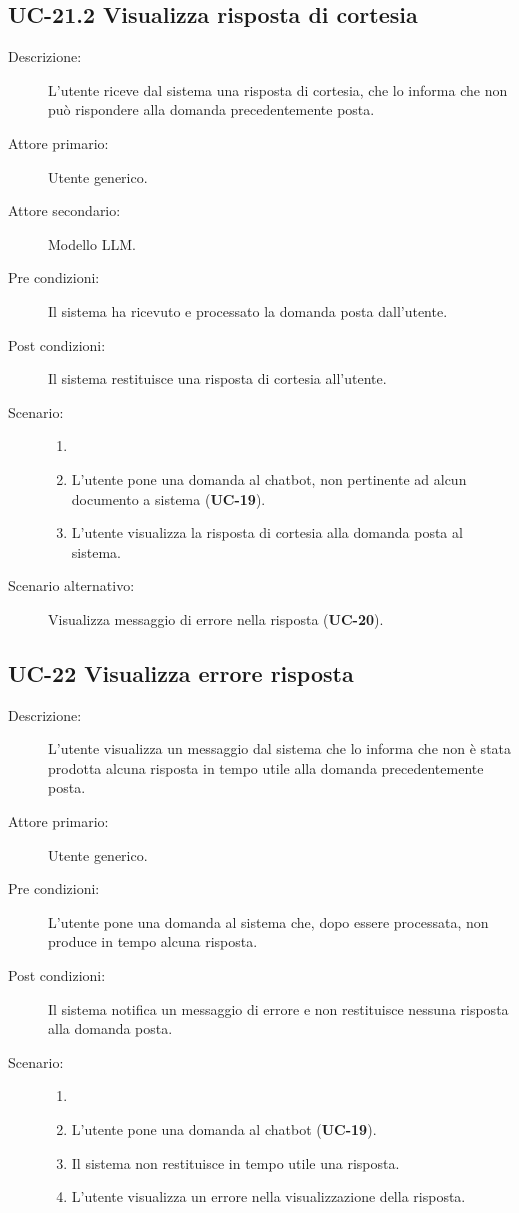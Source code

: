 \subsection{UC-21.2 Visualizza risposta di cortesia}
\begin{description}
    \item[Descrizione:] L'utente riceve dal sistema una risposta di cortesia, che lo informa che non può rispondere alla domanda precedentemente posta.
    \item[Attore primario:] Utente generico.
    \item[Attore secondario:] Modello LLM. 
    \item[Pre condizioni:] Il sistema ha ricevuto e processato la domanda posta dall'utente.
    \item[Post condizioni:] Il sistema restituisce una risposta di cortesia all'utente.
    \item[Scenario:]
    \begin{enumerate}
        \item[]
        \item L’utente pone una domanda al chatbot, non pertinente ad alcun documento a sistema (\textbf{UC-19}).
        \item L'utente visualizza la risposta di cortesia alla domanda posta al sistema.
    \end{enumerate}
    \item[Scenario alternativo:] Visualizza messaggio di errore nella risposta (\textbf{UC-20}).
\end{description}

\subsection{UC-22 Visualizza errore risposta}
\begin{description}
    \item[Descrizione:] L'utente visualizza un messaggio dal sistema che lo informa che non è stata prodotta alcuna risposta in tempo utile alla domanda precedentemente posta.
    \item[Attore primario:] Utente generico.
    \item[Pre condizioni:] L'utente pone una domanda al sistema che, dopo essere processata, non produce in tempo alcuna risposta.
    \item[Post condizioni:] Il sistema notifica un messaggio di errore e non restituisce nessuna risposta alla domanda posta.
    \item[Scenario:] 
    \begin{enumerate}
        \item[]
        \item L’utente pone una domanda al chatbot (\textbf{UC-19}).
        \item Il sistema non restituisce in tempo utile una risposta.
        \item L'utente visualizza un errore nella visualizzazione della risposta.
    \end{enumerate}
\end{description}

